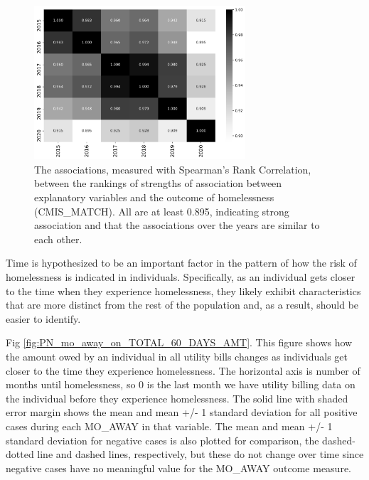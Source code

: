 \documentclass[10pt,letterpaper]{article}
\newcommand{\red}[1]{{\color{red}{#1}}}
\begin{document}
\begin{figure}[htb]
    \centering
    \includegraphics[width=0.7\textwidth]{../img/corr_years.png}
    \caption[Correlation of variable correlation order by year]{The associations, measured with Spearman's Rank Correlation, between the rankings of strengths of association between explanatory variables and the outcome of homelessness (CMIS\_MATCH). All are at least 0.895, indicating strong association and that the associations over the years are similar to each other.}
    \label{fig:corr_years}
\end{figure}

Time is hypothesized to be an important factor in the pattern of how the risk of homelessness is indicated in individuals. Specifically, as an individual gets closer to the time when they experience homelessness, they likely exhibit characteristics that are more distinct from the rest of the population and, as a result, should be easier to identify. 

\red{The relationships between one of the key variables and time was investigated in a series of} Fig \ref{fig:PN_mo_away_on_TOTAL_60_DAYS_AMT}. This figure shows how the amount owed by an individual in all utility bills changes as individuals get closer to the time they experience homelessness. The horizontal axis is number of months until homelessness, so 0 is the last month we have utility billing data on the individual before they experience homelessness. The solid line with shaded error margin shows the mean and mean +/- 1 standard deviation for all positive cases during each MO\_AWAY in that variable. The mean and mean +/- 1 standard deviation for negative cases is also plotted for comparison, the dashed-dotted line and dashed lines, respectively, but these do not change over time since negative cases have no meaningful value for the MO\_AWAY outcome measure.
\end{document}
